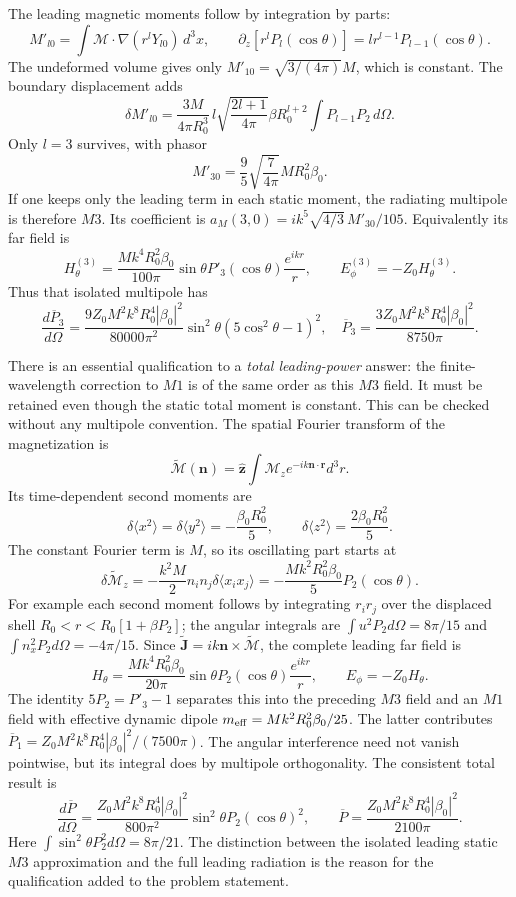 The leading magnetic moments follow by integration by parts:
\[
M'_{l0}=\int\boldsymbol{\mathcal M}\cdot\nabla(r^lY_{l0})\,d^3x,
\qquad
\partial_z[r^lP_l(\cos\theta)]=lr^{l-1}P_{l-1}(\cos\theta).
\]
The undeformed volume gives only $M'_{10}=\sqrt{3/(4\pi)}M$, which is
constant. The boundary displacement adds
\[
\delta M'_{l0}
=\frac{3M}{4\pi R_0^3}\,l\sqrt{\frac{2l+1}{4\pi}}
\beta R_0^{l+2}\int P_{l-1}P_2\,d\Omega.
\]
Only $l=3$ survives, with phasor
\[
\boxed{M'_{30}=\frac95\sqrt{\frac7{4\pi}}MR_0^2\beta_0.}
\]
If one keeps only the leading term in each static moment, the radiating
multipole is therefore $M3$. Its coefficient is
$a_M(3,0)=ik^5\sqrt{4/3}\,M'_{30}/105$. Equivalently its far field is
\[
H_\theta^{(3)}=\frac{Mk^4R_0^2\beta_0}{100\pi}
\sin\theta P'_3(\cos\theta)\frac{e^{ikr}}r,
\qquad E_\phi^{(3)}=-Z_0H_\theta^{(3)}.
\]
Thus that isolated multipole has
\[
\frac{d\overline P_3}{d\Omega}
=\frac{9Z_0M^2k^8R_0^4|\beta_0|^2}{80000\pi^2}
\sin^2\theta(5\cos^2\theta-1)^2,
\quad
\overline P_3=\frac{3Z_0M^2k^8R_0^4|\beta_0|^2}{8750\pi}.
\]

There is an essential qualification to a \emph{total leading-power}
answer: the finite-wavelength correction to $M1$ is of the same order
as this $M3$ field. It must be retained even though the static total
moment is constant. This can be checked without any multipole convention.
The spatial Fourier transform of the magnetization is
\[
\widetilde{\boldsymbol{\mathcal M}}(\mathbf n)
=\hat{\mathbf z}\int \mathcal M_z e^{-ik\mathbf n\cdot\mathbf r}d^3r.
\]
Its time-dependent second moments are
\[
\delta\langle x^2\rangle=\delta\langle y^2\rangle
=-\frac{\beta_0R_0^2}{5},\qquad
\delta\langle z^2\rangle=\frac{2\beta_0R_0^2}{5}.
\]
The constant Fourier term is $M$, so its oscillating part starts at
\[
\delta\widetilde{\mathcal M}_z
=-\frac{k^2M}{2}n_in_j\delta\langle x_ix_j\rangle
=-\frac{Mk^2R_0^2\beta_0}{5}P_2(\cos\theta).
\]
For example each second moment follows by integrating
$r_ir_j$ over the displaced shell
$R_0<r<R_0[1+\beta P_2]$; the angular integrals are
$\int u^2P_2d\Omega=8\pi/15$ and
$\int n_x^2P_2d\Omega=-4\pi/15$.
Since $\widetilde{\mathbf J}=ik\mathbf n\times
\widetilde{\boldsymbol{\mathcal M}}$, the complete leading far field is
\[
\boxed{H_\theta=\frac{Mk^4R_0^2\beta_0}{20\pi}
\sin\theta P_2(\cos\theta)\frac{e^{ikr}}r,
\qquad E_\phi=-Z_0H_\theta.}
\]
The identity $5P_2=P'_3-1$ separates this into the preceding $M3$
field and an $M1$ field with effective dynamic dipole
$m_{\rm eff}=Mk^2R_0^2\beta_0/25$. The latter contributes
$\overline P_1=Z_0M^2k^8R_0^4|\beta_0|^2/(7500\pi)$.
The angular interference need not vanish pointwise, but its integral
does by multipole orthogonality. The consistent total result is
\[
\boxed{\frac{d\overline P}{d\Omega}
=\frac{Z_0M^2k^8R_0^4|\beta_0|^2}{800\pi^2}
\sin^2\theta P_2(\cos\theta)^2,
\qquad
\overline P=\frac{Z_0M^2k^8R_0^4|\beta_0|^2}{2100\pi}.}
\]
Here $\int\sin^2\theta P_2^2d\Omega=8\pi/21$.
The distinction between the isolated leading static $M3$ approximation
and the full leading radiation is the reason for the qualification
added to the problem statement.

